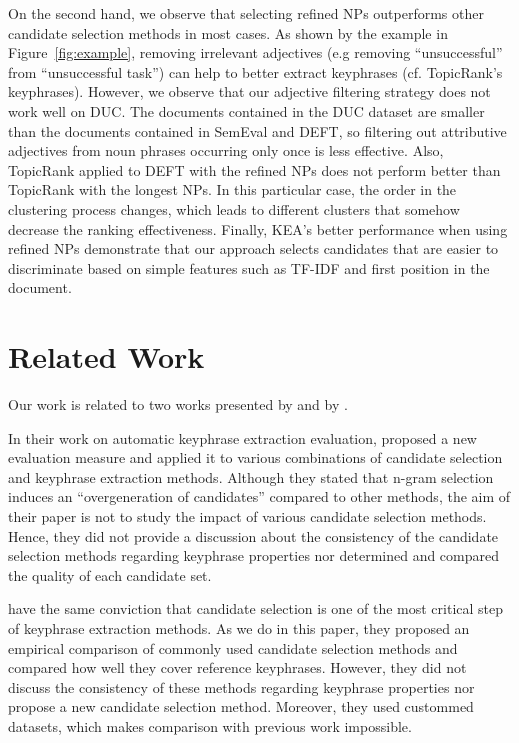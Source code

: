       On the second hand, we observe that selecting refined NPs outperforms
      other candidate selection methods in most cases. As shown by the example
      in Figure~\ref{fig:example}, removing irrelevant adjectives (e.g removing
      ``unsuccessful'' from ``unsuccessful task'') can help to better extract
      keyphrases (cf. TopicRank's keyphrases). However, we observe that
      our adjective filtering strategy does not work well on DUC. The documents
      contained in the DUC dataset are smaller than the documents contained in
      SemEval and DEFT, so filtering out attributive adjectives from noun
      phrases occurring only once is less effective. Also, TopicRank applied to
      DEFT with the refined NPs does not perform better than TopicRank with the
      longest NPs. In this particular case, the order in the clustering process
      changes, which leads to different clusters that somehow decrease the
      ranking effectiveness. Finally, KEA's better performance when using
      refined NPs demonstrate that our approach selects candidates that are
      easier to discriminate based on simple features such as TF-IDF and first
      position in the document.

\section{Related Work}
\label{sec:related_work}
  Our work is related to two works presented by 
  and by .

  In their work on automatic keyphrase extraction evaluation,
   proposed a new evaluation measure and applied it
  to various combinations of candidate selection and keyphrase extraction
  methods. Although they stated that n-gram selection induces an
  ``overgeneration of candidates'' compared to other methods, the aim of their
  paper is not to study the impact of various candidate selection methods.
  Hence, they did not provide a discussion about the consistency of the
  candidate selection methods regarding keyphrase properties nor determined and
  compared the quality of each candidate set.

   have the same conviction
  that candidate selection is one of the most critical step of keyphrase
  extraction methods. As we do in this paper, they proposed an empirical
  comparison of commonly used candidate selection methods and compared how well
  they cover reference keyphrases. However, they did not discuss the consistency
  of these methods regarding keyphrase properties nor propose a new candidate
  selection method. Moreover, they used custommed datasets, which makes
  comparison with previous work impossible.

